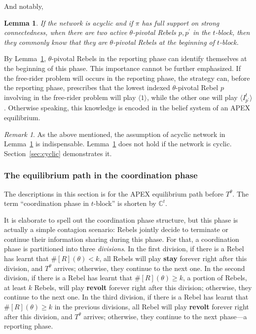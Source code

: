 \documentclass[12pt,letter]{article}
\newcommand{\Kappa}{\mathbb{C}}
\newtheorem{lemma}{Lemma}[section]
\theoremstyle{definition}
\theoremstyle{remark}
\newtheorem*{remark}{Remark}
\theoremstyle{claim}
\begin{document}
And notably,

\begin{lemma}
\label{lemman_pivotals_CK}
If the network is acyclic and if $\pi$ has full support on strong connectedness, when there are two active $\theta$-pivotal Rebels $p,p^{'}$ in the $t$-block, then they commonly know that they are $\theta$-pivotal Rebels at the beginning of $t$-block.
\end{lemma}

By Lemma~\ref{lemman_pivotals_CK}, $\theta$-pivotal Rebels in the reporting phase can identify themselves at the beginning of this phase. This importance cannot be further emphasized. If the free-rider problem will occurs in the reporting phase, the strategy can, before the reporting phase, prescribes that the lowest indexed $\theta$-pivotal Rebel $p$ involving in the free-rider problem will play $\langle 1 \rangle$, while the other one will play $\langle I^t_{p^{'}} \rangle$. Otherwise speaking, this knowledge is encoded in the belief system of an APEX equilibrium. 

\begin{remark}
As the above mentioned, the assumption of acyclic network in Lemma~\ref{lemman_pivotals_CK} is indispensable. Lemma~\ref{lemman_pivotals_CK} does not hold if the network is cyclic. Section~\ref{sec:cyclic} demonstrates it.
\end{remark}






\subsubsection{The equilibrium path in the coordination phase}
\label{sec:eq_cd}
The descriptions in this section is for the APEX equilibrium path {before} $T^{\theta}$. The term ``coordination phase in $t$-block'' is shorten by $\Kappa^{t}$.  

It is elaborate to spell out the coordination phase structure, but this phase is actually a simple contagion scenario: Rebels jointly decide to terminate or continue their information sharing during this phase. For that, a coordination phase is partitioned into three \textit{divisions}. In the first division, if there is a Rebel has learnt that $\#[R](\theta)<k$, all Rebels will play \textbf{stay} forever right after this division, and $T^{\theta}$ arrives; otherwise, they continue to the next one. In the second division, if there is a Rebel has learnt that $\#[R](\theta)\geq k$, a portion of Rebels, at least $k$ Rebels, will play \textbf{revolt} forever right after this division; otherwise, they continue to the next one. In the third division, if there is a Rebel has learnt that $\#[R](\theta)\geq k$ in the previous divisions, all Rebel will play \textbf{revolt} forever right after this division, and $T^{\theta}$ arrives; otherwise, they continue to the next phase---a reporting phase.
\end{document}
